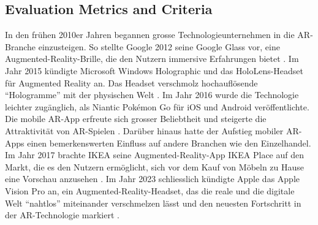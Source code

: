 \subsection{Evaluation Metrics and Criteria}

In den frühen 2010er Jahren begannen grosse Technologieunternehmen in die AR-Branche einzusteigen. So stellte Google 2012 seine Google Glass vor, eine Augmented-Reality-Brille, die den Nutzern immersive Erfahrungen bietet \cite{Google_for_Developer_2012}. Im Jahr 2015 kündigte Microsoft Windows Holographic und das HoloLens-Headset für Augmented Reality an. Das Headset verschmolz hochauflösende “Hologramme” mit der physischen Welt \cite{Tech_Discussion_2015}. Im Jahr 2016 wurde die Technologie leichter zugänglich, als Niantic Pokémon Go für iOS und Android veröffentlichte. Die mobile AR-App erfreute sich grosser Beliebtheit und steigerte die Attraktivität von AR-Spielen \cite{Bond_2016}. Darüber hinaus hatte der Aufstieg mobiler AR-Apps einen bemerkenswerten Einfluss auf andere Branchen wie den Einzelhandel. Im Jahr 2017 brachte IKEA seine Augmented-Reality-App IKEA Place auf den Markt, die es den Nutzern ermöglicht, sich vor dem Kauf von Möbeln zu Hause eine Vorschau anzusehen \cite{IKEA_2017}. Im Jahr 2023 schliesslich kündigte Apple das Apple Vision Pro an, ein Augmented-Reality-Headset, das die reale und die digitale Welt “nahtlos” miteinander verschmelzen lässt und den neuesten Fortschritt in der AR-Technologie markiert \cite{Apple}.
